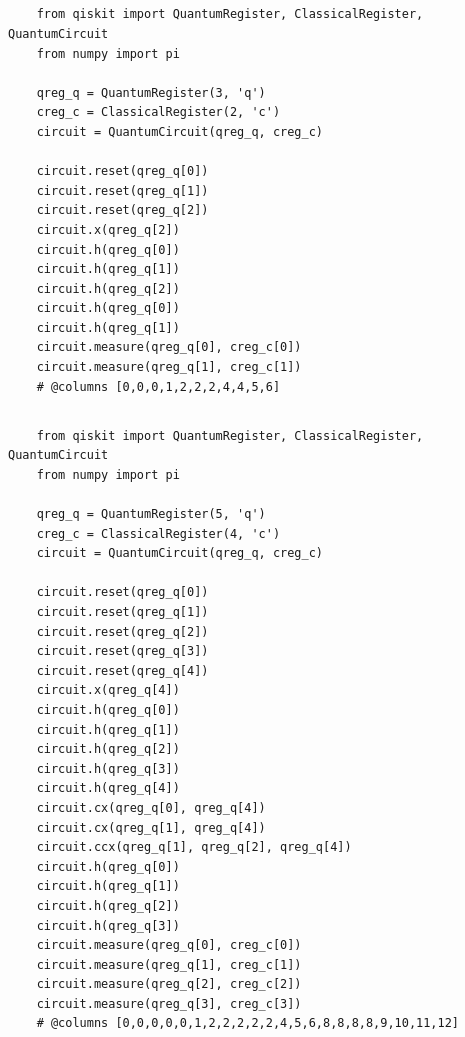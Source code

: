 \documentclass[12pt]{article}
\begin{document}
\subsection*{}

\begin{verbatim}
    from qiskit import QuantumRegister, ClassicalRegister, QuantumCircuit
    from numpy import pi
    
    qreg_q = QuantumRegister(3, 'q')
    creg_c = ClassicalRegister(2, 'c')
    circuit = QuantumCircuit(qreg_q, creg_c)
    
    circuit.reset(qreg_q[0])
    circuit.reset(qreg_q[1])
    circuit.reset(qreg_q[2])
    circuit.x(qreg_q[2])
    circuit.h(qreg_q[0])
    circuit.h(qreg_q[1])
    circuit.h(qreg_q[2])
    circuit.h(qreg_q[0])
    circuit.h(qreg_q[1])
    circuit.measure(qreg_q[0], creg_c[0])
    circuit.measure(qreg_q[1], creg_c[1])
    # @columns [0,0,0,1,2,2,2,4,4,5,6]
\end{verbatim}

\subsection*{}

\begin{verbatim}
    from qiskit import QuantumRegister, ClassicalRegister, QuantumCircuit
    from numpy import pi

    qreg_q = QuantumRegister(5, 'q')
    creg_c = ClassicalRegister(4, 'c')
    circuit = QuantumCircuit(qreg_q, creg_c)

    circuit.reset(qreg_q[0])
    circuit.reset(qreg_q[1])
    circuit.reset(qreg_q[2])
    circuit.reset(qreg_q[3])
    circuit.reset(qreg_q[4])
    circuit.x(qreg_q[4])
    circuit.h(qreg_q[0])
    circuit.h(qreg_q[1])
    circuit.h(qreg_q[2])
    circuit.h(qreg_q[3])
    circuit.h(qreg_q[4])
    circuit.cx(qreg_q[0], qreg_q[4])
    circuit.cx(qreg_q[1], qreg_q[4])
    circuit.ccx(qreg_q[1], qreg_q[2], qreg_q[4])
    circuit.h(qreg_q[0])
    circuit.h(qreg_q[1])
    circuit.h(qreg_q[2])
    circuit.h(qreg_q[3])
    circuit.measure(qreg_q[0], creg_c[0])
    circuit.measure(qreg_q[1], creg_c[1])
    circuit.measure(qreg_q[2], creg_c[2])
    circuit.measure(qreg_q[3], creg_c[3])
    # @columns [0,0,0,0,0,1,2,2,2,2,2,4,5,6,8,8,8,8,9,10,11,12]
\end{verbatim}
\end{document}
